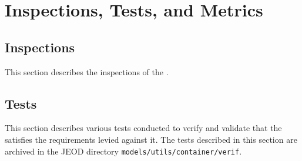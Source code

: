 %
% 

\chapter{Inspections, Tests, and Metrics}
\label{ch:ivv}

\section{Inspections}\label{sec:inspect}
This section describes the inspections of the \ModelDesc.



\newpage
\section{Tests}
This section describes various tests conducted to verify and validate
that the \ModelDesc satisfies the requirements levied against it. 
The tests described in this section
are archived in the JEOD directory \verb+models/utils/container/verif+.






\newpage
\boilerplatetraceability

\newpage
\boilerplatemetrics
